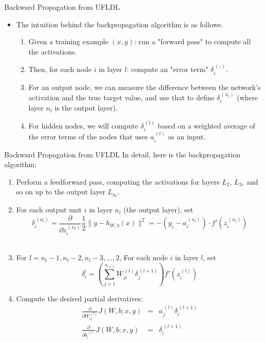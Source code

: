 \documentclass[10pt]{beamer}
\begin{document}
	\begin{frame}{Backward Propagation from UFLDL}
		\begin{itemize}
			\item The intuition behind the backpropagation algorithm is as follows.
			\begin{enumerate}
				\item Given a training example $(x, y)$: run a "forward pass" to compute all the activations.
				\item Then, for each node $i$ in layer $l$: compute an "error term" $\delta_i^{\,(;)}$.
				\item For an output node, we can measure the difference between the network's activation and the true target value, and use that to define $\delta_i^{\,(n_l)}$ (where layer $n_l$ is the output layer).
				\item For hidden nodes, we will compute $\delta_i^{\,(l)}$ based on a weighted average of the error terms of the nodes that uses $a_i^{\,(l)}$ as an input.
			\end{enumerate}
		\end{itemize}
	\end{frame}

	\begin{frame}{Backward Propagation from UFLDL}
		In detail, here is the backpropagation algorithm:
		\begin{enumerate}
			\item Perform a feedforward pass, computing the activations for layers $L_2$, $L_3$, and so on up to the output layer $L_{n_l}$.
			\item For each output unit $i$ in layer $n_l$ (the output layer), set
			$$\delta_i^{\,(n_l)}=\frac{\partial}{\partial z_i^{\,(n_l)}}\frac{1}{2}\lVert y-h_{W,b}(x)\rVert^2=-(y_i-a_i^{\,(n_l)})\cdot f'(z_i^{\,(n_l)})$$\\
			\item For $l=n_l-1,n_l-2,n_l-3,\dots,2$, For each node $i$ in layer $l$, set
			$$\delta_i^{l}=\left(\sum_{j=1}^{s_{l+1}}W_{ji}^{\,(l)}\delta_j^{\,(l+1)}\right)f'(z_i^{\,(l)})$$
			\item Compute the desired partial derivatives:
			\begin{eqnarray*}
				\frac{\partial}{\partial W_{ij}^{\,(l)}}J(W,b;x,y)&=&a_j^{\,(l)}\delta_i^{\,(l+1)}\\
				\frac{\partial}{\partial b_i^{\,(l)}}J(W,b;x,y)&=&\delta_i^{\,(l+1)}
			\end{eqnarray*}
		\end{enumerate}
	\end{frame}
\end{document}
